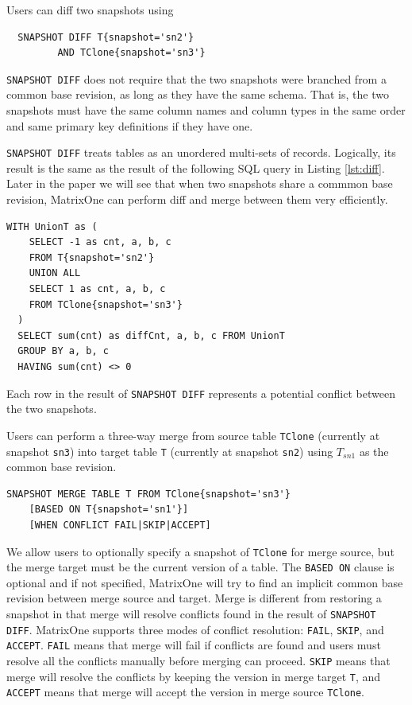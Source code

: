 \documentclass[sigconf,nonacm]{acmart} %
\begin{document}
Users can diff two snapshots using 
\begin{verbatim}
  SNAPSHOT DIFF T{snapshot='sn2'} 
         AND TClone{snapshot='sn3'}
\end{verbatim}  
\texttt{SNAPSHOT DIFF} does not require that the two snapshots 
were branched from a common base revision, as long as they have the same schema. 
That is, the two snapshots must have the same column names and column types in the 
same order and same primary key definitions if they have one.

\texttt{SNAPSHOT DIFF} treats tables as an unordered multi-sets of records.
Logically, its result is the same as the result of the following SQL query 
in Listing \ref{lst:diff}.  Later in the paper we will see that when  
two snapshots share a commmon base revision, MatrixOne can perform 
diff and merge between them very efficiently.
\begin{lstlisting}[label=lst:diff,caption=SNAPSHOT DIFF Query]
  WITH UnionT as (
    SELECT -1 as cnt, a, b, c 
    FROM T{snapshot='sn2'}
    UNION ALL
    SELECT 1 as cnt, a, b, c 
    FROM TClone{snapshot='sn3'}
  )
  SELECT sum(cnt) as diffCnt, a, b, c FROM UnionT 
  GROUP BY a, b, c
  HAVING sum(cnt) <> 0
\end{lstlisting}
Each row in the result of \texttt{SNAPSHOT DIFF} 
represents a potential conflict between the two snapshots.

Users can perform a three-way merge from source table 
\texttt{TClone} (currently at snapshot \texttt{sn3}) 
into target table \texttt{T} (currently at snapshot \texttt{sn2}) 
using $T_{sn1}$ as the common base revision. 
\begin{lstlisting}[label=lst:merge,caption=SNAPSHOT MERGE Query]
  SNAPSHOT MERGE TABLE T FROM TClone{snapshot='sn3'}
    [BASED ON T{snapshot='sn1'}]
    [WHEN CONFLICT FAIL|SKIP|ACCEPT]
\end{lstlisting}
We allow users to optionally specify a snapshot of \texttt{TClone} for merge source,
but the merge target must be the current version of a table.
The \texttt{BASED ON} clause is optional and if not specified, MatrixOne will try to 
find an implicit common base revision between merge source and target.  
Merge is different from restoring a snapshot in 
that merge will resolve conflicts found in the result of \texttt{SNAPSHOT DIFF}.
MatrixOne supports three modes of conflict resolution: \texttt{FAIL}, \texttt{SKIP}, 
and \texttt{ACCEPT}.  \texttt{FAIL} means that merge will fail if conflicts are found
and users must resolve all the conflicts manually before merging can proceed.  
\texttt{SKIP} means that merge will resolve the conflicts by keeping 
the version in merge target \texttt{T}, and \texttt{ACCEPT} means that merge 
will accept the version in merge source \texttt{TClone}.  
\end{document}
